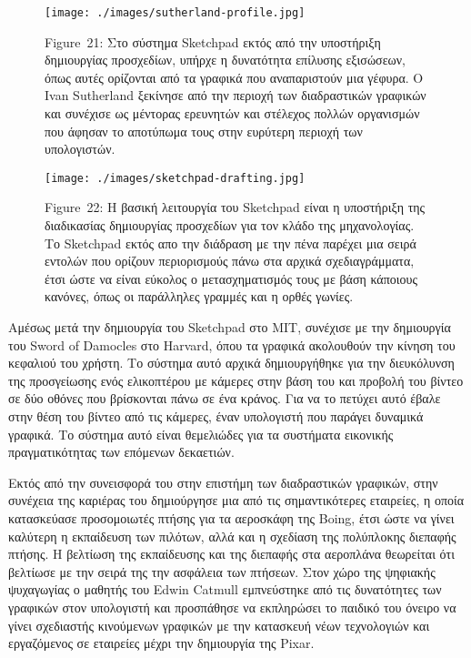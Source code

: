 \documentclass[
]{article}
\begin{document}
\leavevmode{}%
\begin{figure}
\hypertarget{fig:sutherland-profile}{%
\centering
\texttt{[image: ./images/sutherland-profile.jpg]}
\caption{Figure~21: Στο σύστημα Sketchpad εκτός από την υποστήριξη
δημιουργίας προσχεδίων, υπήρχε η δυνατότητα επίλυσης εξισώσεων, όπως
αυτές ορίζονται από τα γραφικά που αναπαριστούν μια γέφυρα. O Ivan
Sutherland ξεκίνησε από την περιοχή των διαδραστικών γραφικών και
συνέχισε ως μέντορας ερευνητών και στέλεχος πολλών οργανισμών που άφησαν
το αποτύπωμα τους στην ευρύτερη περιοχή των
υπολογιστών.}\label{fig:sutherland-profile}
}
\end{figure}

\leavevmode{}%
\begin{figure}
\hypertarget{fig:sketchpad-drafting}{%
\centering
\texttt{[image: ./images/sketchpad-drafting.jpg]}
\caption{Figure~22: Η βασική λειτουργία του Sketchpad είναι η υποστήριξη
της διαδικασίας δημιουργίας προσχεδίων για τον κλάδο της μηχανολογίας.
Το Sketchpad εκτός απο την διάδραση με την πένα παρέχει μια σειρά
εντολών που ορίζουν περιορισμούς πάνω στα αρχικά σχεδιαγράμματα, έτσι
ώστε να είναι εύκολος ο μετασχηματισμός τους με βάση κάποιους κανόνες,
όπως οι παράλληλες γραμμές και η ορθές
γωνίες.}\label{fig:sketchpad-drafting}
}
\end{figure}

Αμέσως μετά την δημιουργία του Sketchpad στο MIT, συνέχισε με την
δημιουργία του Sword of Damocles στο Harvard, όπου τα γραφικά ακολουθούν
την κίνηση του κεφαλιού του χρήστη. Το σύστημα αυτό αρχικά δημιουργήθηκε
για την διευκόλυνση της προσγείωσης ενός ελικοπτέρου με κάμερες στην
βάση του και προβολή του βίντεο σε δύο οθόνες που βρίσκονται πάνω σε ένα
κράνος. Για να το πετύχει αυτό έβαλε στην θέση του βίντεο από τις
κάμερες, έναν υπολογιστή που παράγει δυναμικά γραφικά. Το σύστημα αυτό
είναι θεμελιώδες για τα συστήματα εικονικής πραγματικότητας των επόμενων
δεκαετιών.

Εκτός από την συνεισφορά του στην επιστήμη των διαδραστικών γραφικών,
στην συνέχεια της καριέρας του δημιούργησε μια από τις σημαντικότερες
εταιρείες, η οποία κατασκεύασε προσομοιωτές πτήσης για τα αεροσκάφη της
Boing, έτσι ώστε να γίνει καλύτερη η εκπαίδευση των πιλότων, αλλά και η
σχεδίαση της πολύπλοκης διεπαφής πτήσης. Η βελτίωση της εκπαίδευσης και
της διεπαφής στα αεροπλάνα θεωρείται ότι βελτίωσε με την σειρά της την
ασφάλεια των πτήσεων. Στον χώρο της ψηφιακής ψυχαγωγίας ο μαθητής του
Edwin Catmull εμπνεύστηκε από τις δυνατότητες των γραφικών στον
υπολογιστή και προσπάθησε να εκπληρώσει το παιδικό του όνειρο να γίνει
σχεδιαστής κινούμενων γραφικών με την κατασκευή νέων τεχνολογιών και
εργαζόμενος σε εταιρείες μέχρι την δημιουργία της Pixar.
\end{document}
